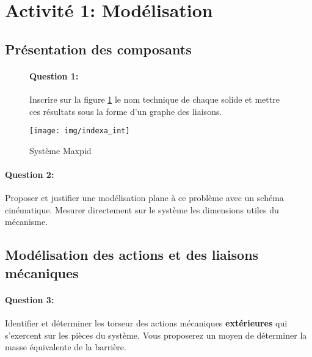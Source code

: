 

\section{Activité 1: Modélisation}

\subsection{Présentation des composants}

\begin{figure}[!h]
 \begin{minipage}{0.45\linewidth}
\paragraph{Question 1:} Inscrire sur la figure \ref{img1} le nom technique de chaque solide et mettre ces résultats sous la forme d'un graphe des liaisons.
 \end{minipage}
  \hfill
 \begin{minipage}{0.45\linewidth}
  \centering\texttt{[image: img/indexa\_int]}
  \caption{Système Maxpid}
  \label{img1}
 \end{minipage}
\end{figure}

\paragraph{Question 2:} Proposer et justifier une modélisation plane à ce problème avec un schéma cinématique. Mesurer directement sur le système les dimensions utiles du mécanisme.

\vspace{6cm}

\subsection{Modélisation des actions et des liaisons mécaniques}

\paragraph{Question 3:} Identifier et déterminer les torseur des actions mécaniques \textbf{extérieures} qui s'exercent sur les pièces du système. Vous proposerez un moyen de déterminer la masse équivalente de la barrière.



